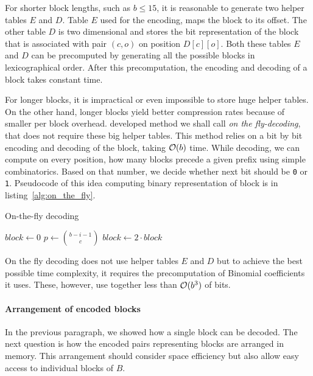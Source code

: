 For shorter block lengths, such as $b\leq 15$, it is reasonable to generate two helper tables $E$ and $D$.
Table $E$ used for the encoding, maps the block to its offset. The other table $D$ is two dimensional and
stores the bit representation of the block that is associated with pair $(c, o)$ on position $D[c][o]$.
Both these tables $E$ and $D$ can be precomputed by generating all the possible blocks in lexicographical
order. After this precomputation, the encoding and decoding of a block takes constant time.

For longer blocks, it is impractical or even impossible to store huge helper tables. On the other
hand, longer blocks yield better compression rates because of smaller per block overhead. \cite{navarro2012fast}
developed method we shall call \textit{on the fly-decoding}, that does not require these big helper tables. 
This method relies on a bit by bit encoding and decoding of the block, taking $\mathcal{O}(b)$ time. While decoding,
we can compute on every position, how many blocks precede a given prefix using simple combinatorics. Based on
that number, we decide whether next bit should be {\tt 0} or {\tt 1}. Pseudocode of this idea computing binary
representation of block is in listing~\ref{alg:on_the_fly}.

\begin{algorithm}
\caption{On-the-fly decoding}\label{alg:on_the_fly}
    $block \gets 0$\;
     {
        $p \gets {b-i-1\choose c}$\;
         {
            $block \gets 2\cdot block$\;
        } 
    }
\end{algorithm}

On the fly decoding does not use helper tables $E$ and $D$ but to achieve the best possible time complexity,
it requires the precomputation of Binomial coefficients it uses. These, however, use together less than $\mathcal{O}(b^3)$
of bits.

\paragraph{Arrangement of encoded blocks}

In the previous paragraph, we showed how a single block can be decoded. The next question is how the
encoded pairs representing blocks are arranged in memory. This arrangement should consider space efficiency
but also allow easy access to individual blocks of $B$.

